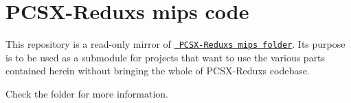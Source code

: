 \chapter{PCSX-\/\+Redux\textquotesingle{}s mips code}
\hypertarget{md_README}{}\label{md_README}
\label{md_README_autotoc_md64}%
%
 This repository is a read-\/only mirror of \href{https://github.com/grumpycoders/pcsx-redux/tree/main/src/mips}{\texttt{ PCSX-\/\+Redux\textquotesingle{}s mips folder}}. Its purpose is to be used as a submodule for projects that want to use the various parts contained herein without bringing the whole of PCSX-\/\+Redux\textquotesingle{}s codebase.

Check the  folder for more information. 